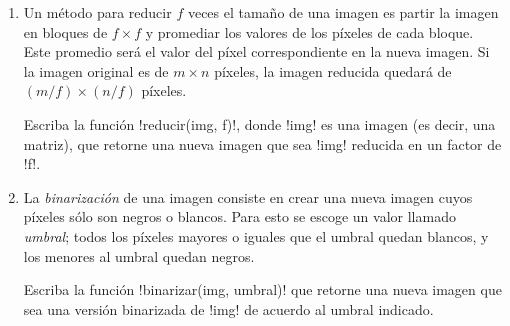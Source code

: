 \begin{enumerate}
  \item
    Un método para reducir \(f\) veces el tamaño de una imagen
    es partir la imagen en bloques de \(f\times f\)
    y promediar los valores de los píxeles de cada bloque.
    Este promedio será el valor del píxel correspondiente en la nueva imagen.
    Si la imagen original es de \(m\times n\) píxeles,
    la imagen reducida quedará de \((m/f) \times (n/f)\) píxeles.

    Escriba la función \li!reducir(img, f)!,
    donde \li!img! es una imagen (es decir, una matriz),
    que retorne una nueva imagen
    que sea \li!img! reducida en un factor de \li!f!.

  \item
    La \emph{binarización} de una imagen
    consiste en crear una nueva imagen cuyos píxeles sólo son negros o blancos.
    Para esto se escoge un valor llamado \emph{umbral};
    todos los píxeles mayores o iguales que el umbral quedan blancos,
    y los menores al umbral quedan negros.

    Escriba la función \li!binarizar(img, umbral)!
    que retorne una nueva imagen
    que sea una versión binarizada de \li!img! de acuerdo al umbral indicado.
\end{enumerate}

